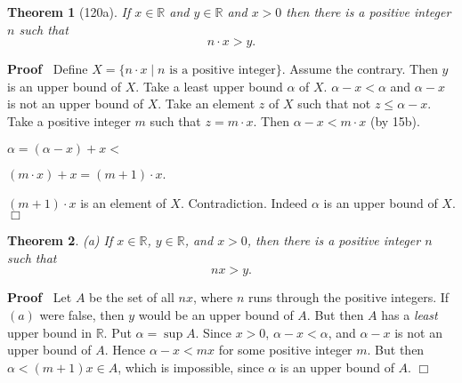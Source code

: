 \documentclass{article}
\newenvironment{forthel}{\begin{leftbar}}{\end{leftbar}}
\newenvironment{proof}{\noindent\textbf{Proof\ }}{\hspace*{\fill}$\Box$\medskip}
\newtheorem{theorem}{Theorem}
\newcommand{\RR}{\mathbb{R}}
\begin{document}
\begin{multicols}{2}

\begin{forthel}
\begin{theorem}[120a] If $x \in \RR$ and $y \in \RR$ and $x > 0$
then there is a 
positive integer $n$ such that $$n \cdot x > y.$$ \end{theorem}
\begin{proof} 
Define $X = \{ n \cdot x \mid n \text{ is a positive integer}\}$.
Assume the contrary.
Then $y$ is an upper bound of $X$.
Take a least upper bound $\alpha$ of $X$.
$\alpha - x < \alpha$ and $\alpha - x$ is not an upper bound of $X$.
Take an element $z$ of $X$ such that not $z \leq \alpha - x$.
Take a positive integer $m$ such that $z = m \cdot x$.
Then $\alpha - x <  m \cdot x$ (by 15b).

$\alpha = (\alpha -x) + x <$

$(m \cdot x) + x = (m+1) \cdot x.$

$(m+1) \cdot x$ is an element of $X$. 
Contradiction. Indeed $\alpha$ is an upper bound of $X$.
\end{proof}

\end{forthel}

\begin{theorem}
(a) If $x\in \mathbb{R}$, $y\in \mathbb{R}$, and $x>0$, then there is a positive integer $n$ such that
$$n x > y.$$
\end{theorem}
\begin{proof}
Let $A$ be the set of all $n x$, where $n$ runs through the positive integers. If $(a)$ were false, then $y$ would be an upper bound of $A$. But then $A$ has a \emph{least} upper bound in $\mathbb{R}$.
Put $\alpha=\sup A$. Since $x>0$, $\alpha-x<\alpha$, and $\alpha-x$ is not an upper bound of $A$. Hence $\alpha-x<m x$ for some positive integer $m$. But then $\alpha<(m+1) x \in A$, which is impossible, since $\alpha$ is an upper bound of $A$.
\end{proof}

\end{multicols}
\newpage
\end{document}

